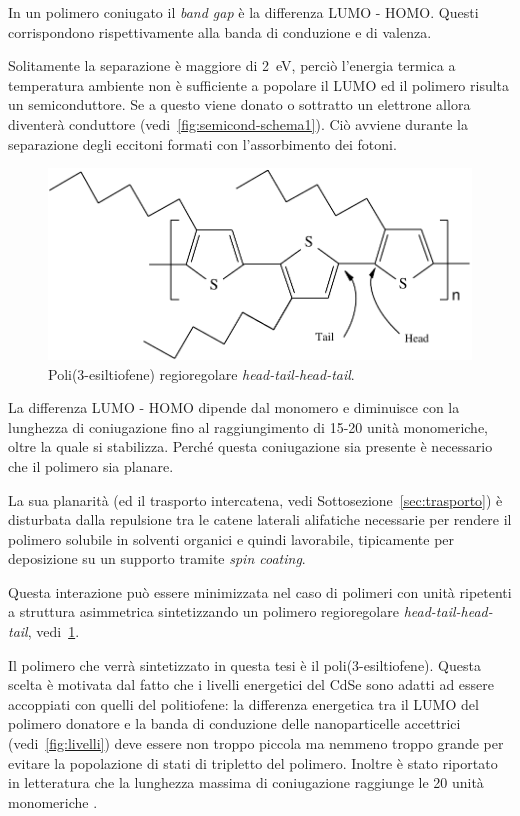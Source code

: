In un polimero coniugato il \emph{band gap} è la differenza LUMO - HOMO\@. Questi corrispondono rispettivamente alla banda di conduzione e di valenza. 

Solitamente la separazione è maggiore di 2~eV, perciò l'energia termica a temperatura ambiente non è sufficiente a popolare il LUMO ed il polimero risulta un semiconduttore.
Se a questo viene donato o sottratto un elettrone allora diventerà conduttore (vedi~\ref{fig:semicond-schema1}). Ciò avviene durante la separazione degli eccitoni formati con l'assorbimento dei fotoni. 
\setlength{\captionmargin}{.0\textwidth}  

\begin{figure}
\begin{center}
    \includegraphics[width=1\textwidth]{Immagini_Tesi/p3ht-htht.pdf}
  \end{center}
  \vspace{-5pt}\footnotesize{\caption{Poli(3-esiltiofene) regioregolare \emph{head-tail-head-tail}.\label{fig:p3ht-htht}}}
\end{figure}
\setlength{\captionmargin}{.10\textwidth}  
      
La differenza LUMO - HOMO dipende dal monomero e diminuisce con la lunghezza di coniugazione fino al raggiungimento di 15-20 unità monomeriche, oltre la quale si stabilizza. Perché questa coniugazione sia presente è necessario che il polimero sia planare. 


La sua planarità (ed il trasporto intercatena, vedi Sottosezione~\ref{sec:trasporto}) è disturbata dalla repulsione tra le catene laterali alifatiche necessarie per rendere il polimero solubile in solventi organici e quindi lavorabile, tipicamente per deposizione su un supporto tramite \emph{spin coating}. 


Questa interazione può essere minimizzata nel caso di polimeri con unità ripetenti a struttura asimmetrica sintetizzando un polimero regioregolare \emph{head-tail-head-tail}\label{regio-htht}, vedi~\ref{fig:p3ht-htht}. 
 
Il polimero che verrà sintetizzato in questa tesi è il poli(3-esiltiofene). Questa scelta è motivata dal fatto che i livelli energetici del CdSe sono adatti ad essere accoppiati con quelli del politiofene: la differenza energetica tra il LUMO del polimero donatore e la banda di conduzione delle nanoparticelle accettrici (vedi~\ref{fig:livelli}) deve essere non troppo piccola ma nemmeno troppo grande per evitare la popolazione di stati di tripletto del polimero. Inoltre è stato riportato in letteratura che la lunghezza massima di coniugazione raggiunge le 20 unità monomeriche \cite{pol-pti-lunghezza}. 


